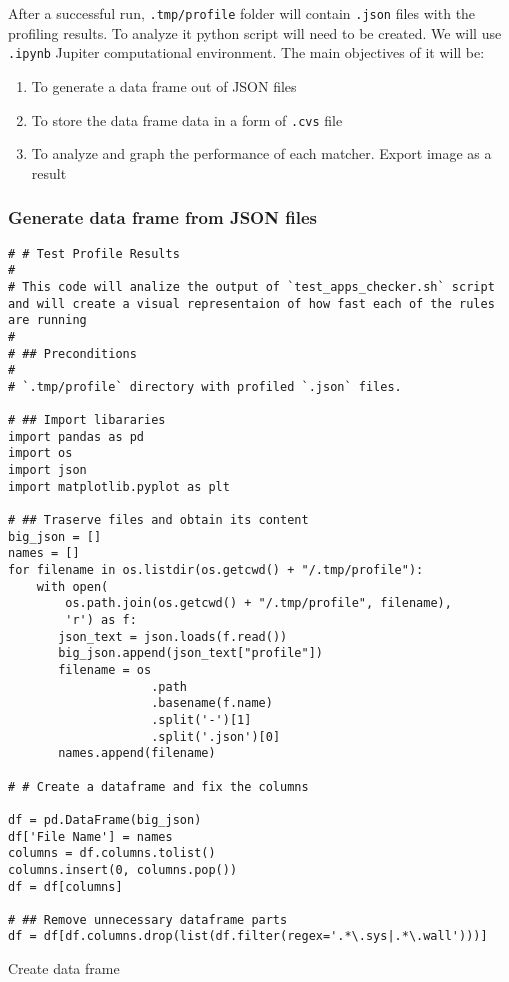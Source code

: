 After a successful run, \lstinline{.tmp/profile} folder will contain \lstinline{.json} files with the profiling results. To analyze it python script will need to be created. We will use \lstinline{.ipynb} Jupiter computational environment. The main objectives of it will be:

\begin{enumerate}
    \item To generate a data frame out of JSON files
    \item To store the data frame data in a form of \lstinline{.cvs} file
    \item To analyze and graph the performance of each matcher. Export image as a result
\end{enumerate}


\subsubsection{Generate data frame from JSON files}

\begin{code}
\begin{verbatim}
# # Test Profile Results
# 
# This code will analize the output of `test_apps_checker.sh` script and will create a visual representaion of how fast each of the rules are running
# 
# ## Preconditions
# 
# `.tmp/profile` directory with profiled `.json` files.

# ## Import libararies
import pandas as pd 
import os
import json
import matplotlib.pyplot as plt 

# ## Traserve files and obtain its content
big_json = []
names = []
for filename in os.listdir(os.getcwd() + "/.tmp/profile"):
    with open(
        os.path.join(os.getcwd() + "/.tmp/profile", filename),
        'r') as f:
       json_text = json.loads(f.read())
       big_json.append(json_text["profile"])
       filename = os
                    .path
                    .basename(f.name)
                    .split('-')[1]
                    .split('.json')[0]
       names.append(filename)

# # Create a dataframe and fix the columns

df = pd.DataFrame(big_json)
df['File Name'] = names
columns = df.columns.tolist()
columns.insert(0, columns.pop())
df = df[columns]

# ## Remove unnecessary dataframe parts
df = df[df.columns.drop(list(df.filter(regex='.*\.sys|.*\.wall')))]
\end{verbatim}
\caption{Create data frame}
\end{code}


